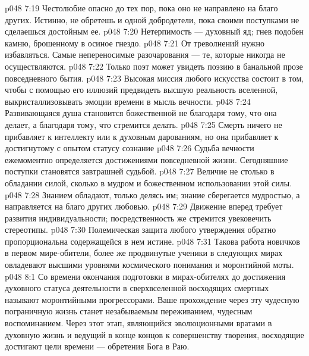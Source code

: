 \vs p048 7:19 \bibnobreakspace Честолюбие опасно до тех пор, пока оно не направлено на благо других. Истинно, не обретешь и одной добродетели, пока своими поступками не сделаешься достойным ее.
\vs p048 7:20 \bibnobreakspace Нетерпимость --- духовный яд; гнев подобен камню, брошенному в осиное гнездо.
\vs p048 7:21 \bibnobreakspace От треволнений нужно избавляться. Самые непереносимые разочарования --- те, которые никогда не осуществляются.
\vs p048 7:22 \bibnobreakspace Только поэт может увидеть поэзию в банальной прозе повседневного бытия.
\vs p048 7:23 \bibnobreakspace Высокая миссия любого искусства состоит в том, чтобы с помощью его иллюзий предвидеть высшую реальность вселенной, выкристаллизовывать эмоции времени в мысль вечности.
\vs p048 7:24 \bibnobreakspace Развивающаяся душа становится божественной не благодаря тому, что она делает, а благодаря тому, что стремится делать.
\vs p048 7:25 \bibnobreakspace Смерть ничего не прибавляет к интеллекту или к духовным дарованиям, но она прибавляет к достигнутому с опытом статусу сознание 
\vs p048 7:26 \bibnobreakspace Судьба вечности ежемоментно определяется достижениями повседневной жизни. Сегодняшние поступки становятся завтрашней судьбой.
\vs p048 7:27 \bibnobreakspace Величие не столько в обладании силой, сколько в мудром и божественном использовании этой силы.
\vs p048 7:28 \bibnobreakspace Знанием обладают, только делясь им; знание сберегается мудростью, а направляется на благо других любовью.
\vs p048 7:29 \bibnobreakspace Движение вперед требует развития индивидуальности; посредственность же стремится увековечить стереотипы.
\vs p048 7:30 \bibnobreakspace Полемическая защита любого утверждения обратно пропорциональна содержащейся в нем истине.
\vs p048 7:31 \pc Такова работа новичков в первом мире\hyp{}обители, более же продвинутые ученики в следующих мирах овладевают высшими уровнями космического понимания и моронтийной моты.
\vs p048 8:1 Со времени окончания подготовки в мирах\hyp{}обителях до достижения духовного статуса деятельности в сверхвселенной восходящих смертных называют моронтийными прогрессорами. Ваше прохождение через эту чудесную пограничную жизнь станет незабываемым переживанием, чудесным воспоминанием. Через этот этап, являющийся эволюционными вратами в духовную жизнь и ведущий в конце концов к совершенству творения, восходящие достигают цели времени --- обретения Бога в Раю.
